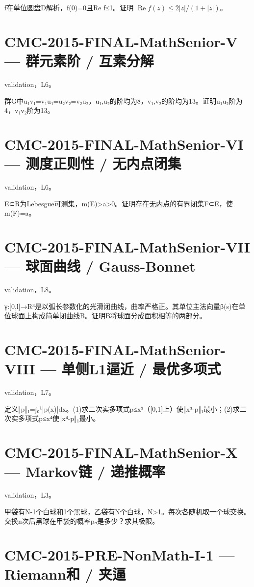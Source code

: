 \documentclass[UTF8]{ctexart}
\begin{document}
f在单位圆盘D解析，f(0)=0且Re f≤1。证明 $\operatorname{Re}f(z)\le2|z|/(1+|z|)$。

\section*{CMC-2015-FINAL-MathSenior-V — 群元素阶 / 互素分解}

validation，L6。

群G中u₁v₁=v₁u₁=u₂v₂=v₂u₂，u₁,u₂的阶均为8，v₁,v₂的阶均为13。证明u₁u₂阶为4，v₁v₂阶为13。

\section*{CMC-2015-FINAL-MathSenior-VI — 测度正则性 / 无内点闭集}

validation，L6。

E⊂R为Lebesgue可测集，m(E)>a>0。证明存在无内点的有界闭集F⊂E，使m(F)=a。

\section*{CMC-2015-FINAL-MathSenior-VII — 球面曲线 / Gauss-Bonnet}

validation，L8。

γ:[0,l]→R³是以弧长参数化的光滑闭曲线，曲率严格正。其单位主法向量β(s)在单位球面上构成简单闭曲线B。证明B将球面分成面积相等的两部分。

\section*{CMC-2015-FINAL-MathSenior-VIII — 单侧L1逼近 / 最优多项式}

validation，L7。

定义‖p‖₁=∫₀¹|p(x)|dx。(1)求二次实多项式p≤x³（[0,1]上）使‖x³-p‖₁最小；(2)求二次实多项式p≤x⁴使‖x⁴-p‖₁最小。

\section*{CMC-2015-FINAL-MathSenior-X — Markov链 / 递推概率}

validation，L3。

甲袋有N-1个白球和1个黑球，乙袋有N个白球，N>1。每次各随机取一个球交换。交换n次后黑球在甲袋的概率pₙ是多少？求其极限。

\section*{CMC-2015-PRE-NonMath-I-1 — Riemann和 / 夹逼}
\end{document}
